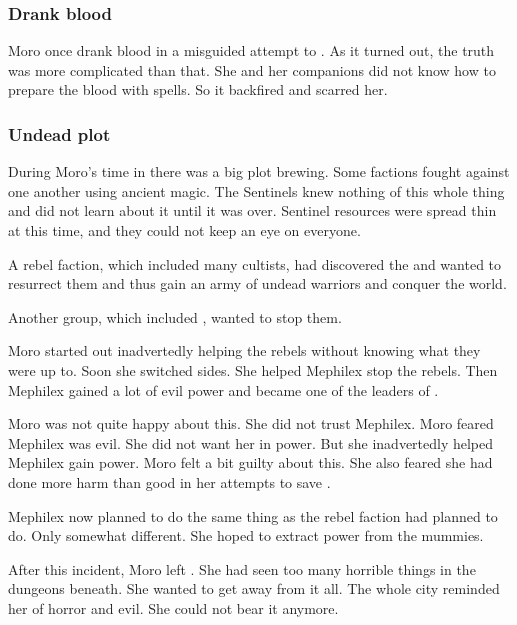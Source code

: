\subsubsection{Drank \draconian blood}
Moro once drank \dragon blood in a misguided attempt to .
As it turned out, the truth was more complicated than that.
She and her companions did not know how to prepare the \dragon blood with spells.
So it backfired and scarred her.





\subsubsection{Undead plot}
During Moro's time in \Yormis there was a big plot brewing.
Some factions fought against one another using ancient magic.
The Sentinels knew nothing of this whole thing and did not learn about it until it was over.
Sentinel resources were spread thin at this time, and they could not keep an eye on everyone.

A rebel faction, which included many \Ubloth cultists, had discovered the  and wanted to resurrect them and thus gain an army of undead warriors and conquer the world. 

Another group, which included , wanted to stop them. 

Moro started out inadvertedly helping the rebels without knowing what they were up to.
Soon she switched sides. 
She helped Mephilex stop the rebels. 
Then Mephilex gained a lot of evil power and became one of the leaders of \Yormis. 

Moro was not quite happy about this. 
She did not trust Mephilex.
Moro feared Mephilex was evil.
She did not want her in power.
But she inadvertedly helped Mephilex gain power.
Moro felt a bit guilty about this. 
She also feared she had done more harm than good in her attempts to save \Yormis.

Mephilex now planned to do the same thing as the rebel faction had planned to do.
Only somewhat different. 
She hoped to extract power from the mummies. 

After this incident, Moro left \Yormis. 
She had seen too many horrible things in the dungeons beneath. 
She wanted to get away from it all.
The whole city reminded her of horror and evil. 
She could not bear it anymore. 

